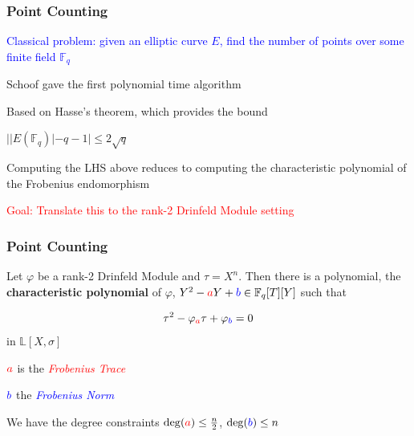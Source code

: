 \documentclass{beamer}
\newcommand{\blue}{\textcolor{blue}}
\newcommand{\red}{\textcolor{red}}
\newcommand{\spa}{\vspace{0.2cm}}
\newcommand{\red}{\textnormal{red}}
\newcommand{\spa}{\textnormal{ }}
\begin{document}

\begin{frame}
\frametitle{Point Counting}


 \blue{Classical problem: given an elliptic curve $E$, find the number of points over some finite field $\mathbb{F}_q$} 
 
 \spa
 
Schoof gave the first polynomial time algorithm

\spa

Based on Hasse's theorem, which provides the bound 

\centerline {$ | |E(\mathbb{F}_q)| - q - 1  | \leq 2 \sqrt{q} $}

\spa

 Computing the LHS above reduces to computing the characteristic polynomial of the Frobenius endomorphism
 
 \spa
\red{Goal: Translate this to the rank-2 Drinfeld Module setting}


\end{frame}









\begin{frame}
\frametitle{Point Counting}

\begin{theorem}[Gekeler, 1991]
Let $\varphi$ be a rank-2 Drinfeld Module and $\tau = X^n$. Then there is a polynomial, the \textbf{characteristic polynomial} of $\varphi$,  $Y^2 - \red{a}Y +\blue{b} \in \mathbb{F}_q[T][Y]$ such that

\[\tau^2 -\varphi_{\red{a}}\tau + \varphi_{\blue{b}} = 0\]
in $\mathbb{L}[X,\sigma]$
\end{theorem}

\spa

$\red{a}$ is the \red{\textit{Frobenius Trace}}

\spa

$\blue{b}$ the \blue{\textit{Frobenius Norm}}

\spa

We have the degree constraints $\deg(\red{a}) \leq \frac{n}{2}$, $\deg(\blue{b}) \leq n$


\end{frame}
\end{document}
